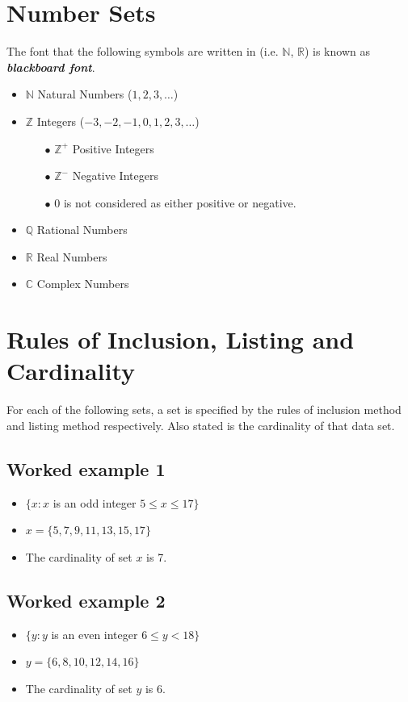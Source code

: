 \documentclass[]{report}
\begin{document}
\section*{Number Sets}
The font that the following symbols are written in (i.e. $\mathbb{N}$, $\mathbb{R}$) is known as \textit{\textbf{blackboard font}}.
\begin{itemize}
\item $\mathbb{N}$ Natural Numbers ($1,2,3,\ldots$) 
\item $\mathbb{Z}$ Integers ($-3,-2,-1,0,1,2,3, \ldots$)
\begin{itemize}
\item[$\bullet$] $\mathbb{Z}^{+}$ Positive Integers
\item[$\bullet$] $\mathbb{Z}^{-}$ Negative Integers
\item[$\bullet$] 0 is not considered as either positive or negative.
\end{itemize}
\item $\mathbb{Q}$ Rational Numbers
\item $\mathbb{R}$ Real Numbers
\item $\mathbb{C}$ Complex Numbers
\end{itemize}
\newpage
\section*{Rules of Inclusion, Listing and Cardinality}
For each of the following sets, a set is specified by the rules of inclusion method and listing method respectively. Also stated is the cardinality of that data set.
\subsection*{Worked example 1}
\begin{itemize}
\item $\{ x : x $ is an odd integer $ 5 \leq x \leq 17 \}$
\item $x = \{5,7,9,11,13,15,17\}$
\item The cardinality of set $x$ is 7.
\end{itemize}

\subsection*{Worked example 2}
\begin{itemize}
\item $\{ y : y $ is an even integer $ 6 \leq y < 18 \}$
\item $y = \{6,8,10,12,14,16\}$
\item The cardinality of set $y$ is 6.
\end{itemize}
\end{document}
